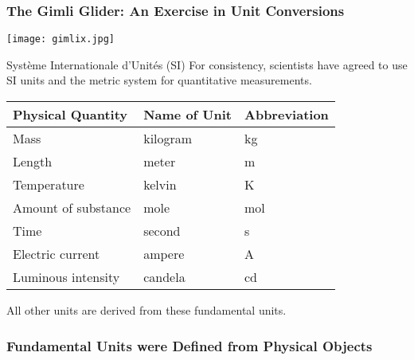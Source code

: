 \documentclass[10pt,letterpaper,twoside]{article}
\begin{document}
\begin{frame}[c]
	\frametitle{The Gimli Glider: An Exercise in Unit Conversions}
	\begin{center}
		\texttt{[image: gimlix.jpg]}
	\end{center}
\end{frame}

\begin{frame}{Système Internationale d'Unités (SI)}
	For consistency, scientists have agreed to use \alert{SI units} and the
	\alert{metric system} for quantitative measurements.

	\begin{center}
		\renewcommand\arraystretch{1.1}
		\begin{tabular}{l@{\qquad}l@{\qquad}l}
			\toprule
			\bfseries Physical Quantity & \bfseries Name of Unit &
			\bfseries Abbreviation \\ \midrule
			Mass                & kilogram & \si{\kilo\gram }\\
			Length              & meter    & \si{\meter     }\\
			Temperature         & kelvin   & \si{\kelvin    }\\
			Amount of substance & mole     & \si{\mole      }\\
			Time                & second   & \si{\second    }\\
			Electric current    & ampere   & \si{\ampere    }\\
			Luminous intensity  & candela  & \si{\candela   }\\
			\bottomrule
		\end{tabular}
	\end{center}

	\begin{center}
		All other units are derived from these \alert{fundamental} units.
	\end{center}
\end{frame}

\begin{frame}[c]
	\frametitle{Fundamental Units were Defined from Physical Objects}

	\begin{center}
	\end{center}
\end{frame}
\end{document}
